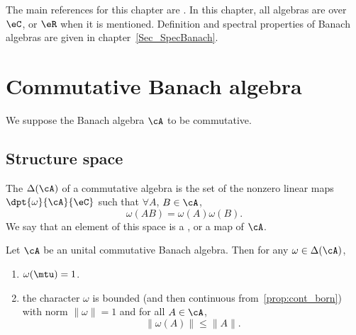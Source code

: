
The main references for this chapter are \cite{Dixmier,Landsman}. In this chapter, all algebras are over $\eC$, or $\eR$ when it is mentioned. Definition and spectral properties of Banach algebras are given in chapter~\ref{Sec_SpecBanach}.

\section{Commutative Banach algebra}

We suppose the Banach algebra $\cA$ to be commutative.

\subsection{Structure space}

\begin{definition}      \label{DefStructureSpaceDel}
    The  $\Delta(\cA)$ of a commutative algebra is the set of the nonzero linear maps $\dpt{\omega}{\cA}{\eC}$ such that $\forall A$, $B\in\cA$,
\[
    \omega(AB)=\omega(A)\omega(B).
\]
We say that an element of this space is a , or a  map of $\cA$.
\end{definition}

\begin{proposition}
Let $\cA$ be an unital commutative Banach algebra. Then for any $\omega\in\Delta(\cA)$,
\begin{enumerate}

\item $\omega(\mtu)=1$.
\item the character $\omega$ is bounded (and then continuous from~\ref{prop:cont_born}) with norm $\|\omega\|=1$ and for all $A\in\cA$,
\begin{equation} \label{eq:omAleqnA}
  \|\omega(A)\|\leq \|A\|.
\end{equation}
\end{enumerate}
\end{proposition}


